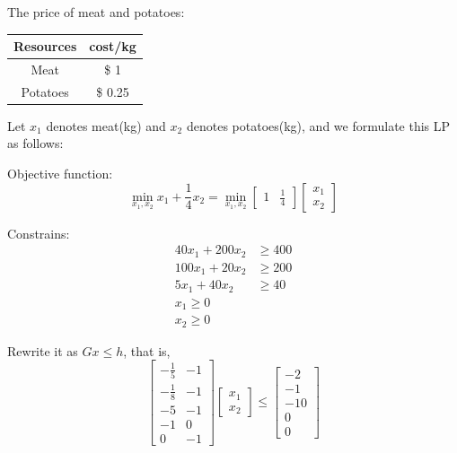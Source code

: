 \vspace{0.3cm}
The price of meat and potatoes:
\begin{center}
	\begin{tabular}{|c|c|}
		\hline 
		Resources&cost/kg\\
		\hline  
		Meat &\$ 1\\
		\hline 
		Potatoes &\$ 0.25\\
		\hline 
	\end{tabular}
\end{center}

Let $x_1$ denotes meat(kg) and $x_2$ denotes potatoes(kg), and we formulate this LP as follows:

Objective function:
\begin{equation*}
	\min_{x_1, x_2} x_1 + \frac{1}{4}x_2 = 
	\min_{x_1, x_2}
	\begin{bmatrix}
		1 & \frac{1}{4}
	\end{bmatrix}
	\begin{bmatrix}
		x_1\\
		x_2
	\end{bmatrix}
\end{equation*}

Constrains:
\begin{align*}
	40x_1 + 200x_2 &\geq 400\\
	100x_1 + 20x_2 &\geq 200\\
	5x_1 + 40x_2 &\geq 40\\
	x_1 \geq 0\\
	x_2 \geq 0
\end{align*}


Rewrite it as $Gx\leq h$, that is,
\begin{equation*}
	\begin{bmatrix}
		-\frac{1}{5} & -1\\
		-\frac{1}{8} & -1\\
		-5 & -1\\
		-1 & 0\\
		0 & -1
	\end{bmatrix}
	\begin{bmatrix}
		x_1\\
		x_2
	\end{bmatrix}\leq
	\begin{bmatrix}
		-2\\
		-1\\
		-10\\
		0\\
		0
	\end{bmatrix}
\end{equation*}

